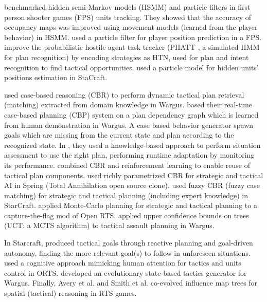 \cite{Hladky_anevaluation} benchmarked hidden semi-Markov models (HSMM) and particle filters in first person shooter games (FPS) units tracking. They showed that the accuracy of occupancy maps was improved using movement models (learned from the player behavior) in HSMM. \cite{particlefiltergameAI} used a particle filter for player position prediction in a FPS. \cite{Kabanza2010} improve the probabilistic hostile agent task tracker (PHATT \citep{PHATT}, a simulated HMM for plan recognition) by encoding strategies as HTN, used for plan and intent recognition to find tactical opportunities. \cite{weber2011aiide} used a particle model for hidden units' positions estimation in StaCraft.

\cite{LTW} used case-based reasoning (CBR) to perform dynamic tactical plan retrieval (matching) extracted from domain knowledge in Wargus. \cite{Ontanon2007} based their real-time case-based planning (CBP) system on a plan dependency graph which is learned from human demonstration in Wargus. A case based behavior generator spawn goals which are missing from the current state and plan according to the recognized state. In \citep{Mishra2008,metalevelbehavioradaptrts}, they used a knowledge-based approach to perform situation assessment to use the right plan, performing runtime adaptation by monitoring its performance. \cite{CBR-RL} combined CBR and reinforcement learning to enable reuse of tactical plan components. 
\cite{Bakkes09} used richly parametrized CBR for strategic and tactical AI in Spring (Total Annihilation open source clone). 
\cite{CadenaG11} used fuzzy CBR (fuzzy case matching) for strategic and tactical planning (including expert knowledge) in StarCraft. \cite{Chung05} applied Monte-Carlo planning for strategic and tactical planning to a capture-the-flag mod of Open RTS. \cite{UCT} applied upper confidence bounds on trees (UCT: a MCTS algorithm) to tactical assault planning in Wargus. 

In Starcraft, \cite{Weber2010cr,WeberCIG10} produced tactical goals through reactive planning and goal-driven autonomy, finding the more relevant goal(s) to follow in unforeseen situations. 
\cite{SORTS} used a cognitive approach mimicking human attention for tactics and units control in ORTS. \cite{PonsenMSA06} developed an evolutionary state-based tactics generator for Wargus. %
Finally, Avery et al. \cite{Avery09} and Smith et al. \cite{SmithCIG10} co-evolved influence map trees for spatial (tactical) reasoning in RTS games. 


